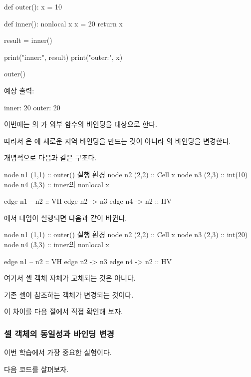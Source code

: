 \begin{dhkcode}
def outer():
    x = 10

    def inner():
        nonlocal x
        x = 20
        return x

    result = inner()

    print("inner:", result)
    print("outer:", x)


outer()
\end{dhkcode}

예상 출력:

\begin{dhkzsh}
inner: 20
outer: 20
\end{dhkzsh}

이번에는 의 가 외부 함수의 바인딩을 대상으로 한다.

따라서 은 에 새로운 지역 바인딩을 만드는 것이 아니라 의  바인딩을 변경한다.

개념적으로 다음과 같은 구조다.

\begin{dhkdiagram}[in=6]
node n1 (1,1) :: outer() 실행 환경
node n2 (2,2) :: Cell x
node n3 (2,3) :: int(10)
node n4 (3,3) :: inner의 nonlocal x

edge n1 -- n2 :: VH
edge n2 -> n3
edge n4 -> n2 :: HV
\end{dhkdiagram}

에서 대입이 실행되면 다음과 같이 바뀐다.

\begin{dhkdiagram}[in=6]
node n1 (1,1) :: outer() 실행 환경
node n2 (2,2) :: Cell x
node n3 (2,3) :: int(20)
node n4 (3,3) :: inner의 nonlocal x

edge n1 -- n2 :: VH
edge n2 -> n3
edge n4 -> n2 :: HV
\end{dhkdiagram}

여기서 셀 객체 자체가 교체되는 것은 아니다.

기존 셀이 참조하는 객체가 변경되는 것이다.

이 차이를 다음 절에서 직접 확인해 보자.

\subsubsection{셀 객체의 동일성과 바인딩 변경}

이번 학습에서 가장 중요한 실험이다.

다음 코드를 살펴보자.

